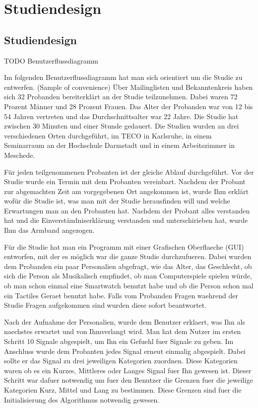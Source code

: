 
\chapter{Studiendesign}
\label{ch:Studiendesign}

\section{Studiendesign}
\label{ch:Evolutionärer Algorithmus:sec:Studiendesign}
TODO Benutzerflussdiagramm

Im folgenden Benutzerflussdiagramm hat man sich orientiert um die Studie zu entwerfen. (Sample of convenience) Über Mailinglisten und Bekanntenkreis haben sich 32 Probanden bereiterklärt an der Studie teilzunehmen. Dabei waren 72 Prozent Männer und 28 Prozent Frauen. Das Alter der Probanden war von 12 bis 54 Jahren vertreten und das Durchschnittsalter war 22 Jahre. Die Studie hat zwischen 30 Minuten und einer Stunde gedauert.
Die Studien wurden an drei verschiedenen Orten durchgeführt, im TECO in Karlsruhe, in einem Seminarraum an der Hochschule Darmstadt und in einem Arbeitszimmer in Meschede.

Für jeden teilgenommenen Probanten ist der gleiche Ablauf durchgeführt. 
Vor der Studie wurde ein Termin mit dem Probanten vereinbart. Nachdem der Probant zur abgemachten Zeit am vorgegebenen Ort angekommen ist, wurde Ihm erklärt wofür die Studie ist, was man mit der Studie herausfinden will und welche Erwartungen man an den Probanten hat. 
Nachdem der Probant alles verstanden hat und die Einverständniserklärung verstanden und unterschirieben hat, wurde Ihm das Armband angezogen. 

Für die Studie hat man ein Programm mit einer Grafischen Oberflaeche (GUI) entworfen, mit der es möglich war die ganze Studie durchzufueren. 
Dabei wurden dem Probanden ein paar Personalien abgefragt, wie das Alter, das Geschlecht, ob sich die Person als Musikalisch empfindet, ob man Computerspiele spielen würde, ob man schon einmal eine Smartwatch benutzt habe und ob die Person schon mal ein Tactiles Geraet benutzt habe. Falls vom Probanden Fragen waehrend der Studie Fragen aufgekommen sind wurden diese sofort beantwortet. 

Nach der Aufnahme der Personalien, wurde dem Benutzer erklaert, was Ihn als naechstes erwartet und von Ihmverlangt wird. 
Man hat dem Nutzer im ersten Schritt 10 Signale abgespielt, um Ihn ein Gefuehl fuer Signale zu geben. Im Anschluss wurde dem Probanten jedes Signal erneut einmalig abgespielt. Dabei sollte er das Signal zu drei jeweiligen Kategorien zuordnen. Diese Kategorien waren ob es ein Kurzes, Mittleres oder Langes Signal fuer Ihn gewesen ist. Dieser Schritt war dafuer notwendig um fuer den Benutzer die Grenzen fuer die jeweilige Kategorien Kurz, Mittel und Lang zu bestimmen. 
Diese Grenzen sind fuer die Initialisierung des Algorithmus notwendig gewesen. 

